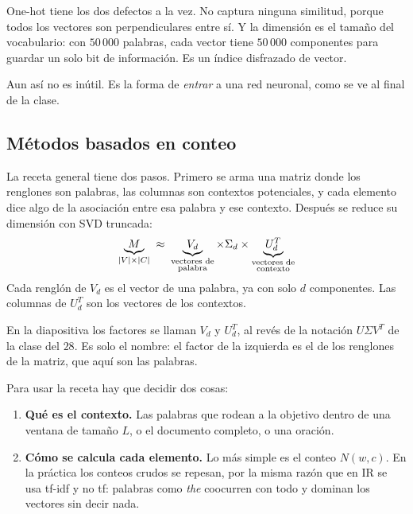 \documentclass[11pt,letterpaper]{article}
\begin{document}
\begin{ojo}
    One-hot tiene los dos defectos a la vez. No captura ninguna
    similitud, porque todos los vectores son perpendiculares entre sí.
    Y la dimensión es el tamaño del vocabulario: con $50\,000$
    palabras, cada vector tiene $50\,000$ componentes para guardar un
    solo bit de información. Es un índice disfrazado de vector.
\end{ojo}

Aun así no es inútil. Es la forma de \emph{entrar} a una red neuronal,
como se ve al final de la clase.


\subsection*{Métodos basados en conteo}

La receta general tiene dos pasos. Primero se arma una matriz donde
los renglones son palabras, las columnas son contextos potenciales, y
cada elemento dice algo de la asociación entre esa palabra y ese
contexto. Después se reduce su dimensión con SVD truncada:
\[
    \underbrace{M}_{\left\lvert V \right\rvert \times \left\lvert C \right\rvert}
    \;\approx\;
    \underbrace{V_d}_{\substack{\text{vectores de}\\\text{palabra}}}
    \times \Sigma_d \times
    \underbrace{U_d^{T}}_{\substack{\text{vectores de}\\\text{contexto}}}
\]
Cada renglón de $V_d$ es el vector de una palabra, ya con solo $d$
componentes. Las columnas de $U_d^{T}$ son los vectores de los
contextos.

\begin{observacion}
    En la diapositiva los factores se llaman $V_d$ y $U_d^{T}$, al
    revés de la notación $U\Sigma V^{T}$ de la clase del $28$. Es solo
    el nombre: el factor de la izquierda es el de los renglones de la
    matriz, que aquí son las palabras.
\end{observacion}

Para usar la receta hay que decidir dos cosas:

\begin{enumerate}[itemsep=0.3em]
    \item \textbf{Qué es el contexto.} Las palabras que rodean a la
          objetivo dentro de una ventana de tamaño $L$, o el documento
          completo, o una oración.
    \item \textbf{Cómo se calcula cada elemento.} Lo más simple es el
          conteo $N(w, c)$. En la práctica los conteos crudos se
          repesan, por la misma razón que en IR se usa tf-idf y no tf:
          palabras como \textit{the} coocurren con todo y dominan los
          vectores sin decir nada.
\end{enumerate}
\end{document}
